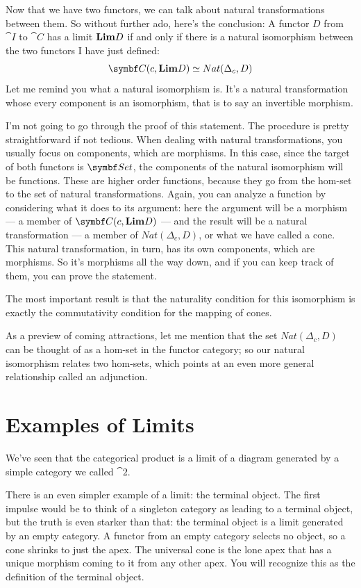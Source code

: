 Now that we have two functors, we can talk about natural transformations
between them. So without further ado, here's the conclusion: A functor
$D$ from $\cat{I}$ to $\cat{C}$ has a limit $\Lim[D]$ if and
only if there is a natural isomorphism between the two functors I have
just defined:
\[\cat{C}(c, \Lim[D]) \simeq Nat(\Delta_c, D)\]
Let me remind you what a natural isomorphism is. It's a natural
transformation whose every component is an isomorphism, that is to say
an invertible morphism.

I'm not going to go through the proof of this statement. The procedure
is pretty straightforward if not tedious. When dealing with natural
transformations, you usually focus on components, which are morphisms.
In this case, since the target of both functors is $\Set$, the
components of the natural isomorphism will be functions. These are
higher order functions, because they go from the hom-set to the set of
natural transformations. Again, you can analyze a function by
considering what it does to its argument: here the argument will be a
morphism --- a member of $\cat{C}(c, \Lim[D])$ --- and the result will
be a natural transformation --- a member of $Nat(\Delta_c, D)$, or
what we have called a cone. This natural transformation, in turn, has
its own components, which are morphisms. So it's morphisms all the way
down, and if you can keep track of them, you can prove the statement.

The most important result is that the naturality condition for this
isomorphism is exactly the commutativity condition for the mapping of
cones.

As a preview of coming attractions, let me mention that the set
$Nat(\Delta_c, D)$ can be thought of as a hom-set in the functor
category; so our natural isomorphism relates two hom-sets, which points
at an even more general relationship called an adjunction.

\section{Examples of Limits}

We've seen that the categorical product is a limit of a diagram
generated by a simple category we called $\cat{2}$.

There is an even simpler example of a limit: the terminal object. The
first impulse would be to think of a singleton category as leading to a
terminal object, but the truth is even starker than that: the terminal
object is a limit generated by an empty category. A functor from an
empty category selects no object, so a cone shrinks to just the apex.
The universal cone is the lone apex that has a unique morphism coming to
it from any other apex. You will recognize this as the definition of the
terminal object.

